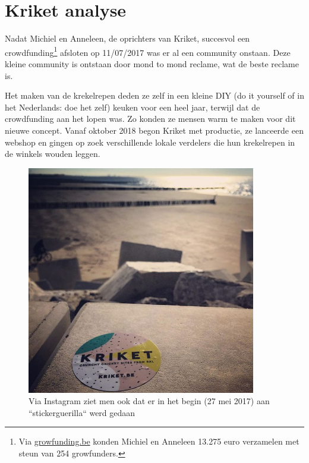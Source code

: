 
\chapter{Kriket analyse}
\label{ch:analyse}

Nadat Michiel en Anneleen, de oprichters van Kriket, succesvol een crowdfunding\footnote{Via \href{https://www.growfunding.be/nl/bxl/kriket}{growfunding.be} konden Michiel en Anneleen 13.275 euro verzamelen met steun van 254 growfunders.} afsloten op 11/07/2017 was er al een community onstaan. Deze kleine community is ontstaan door mond to mond reclame, wat de beste reclame is.

Het maken van de krekelrepen deden ze zelf in een kleine DIY (do it yourself of in het Nederlands: doe het zelf) keuken voor een heel jaar, terwijl dat de crowdfunding aan het lopen was. Zo konden ze mensen warm te maken voor dit nieuwe concept. Vanaf oktober 2018 begon Kriket met productie, ze lanceerde een webshop en gingen op zoek verschillende lokale verdelers die hun krekelrepen in de winkels wouden leggen.  

\begin{figure}[h!]
	\includegraphics[width=100mm]{img/stickerguerilla.jpg}
	\centering
	\caption{Via Instagram ziet men ook dat er in het begin (27 mei 2017) aan ``stickerguerilla`` werd gedaan}
	\label{fig:stickerguerilla}
\end{figure}

